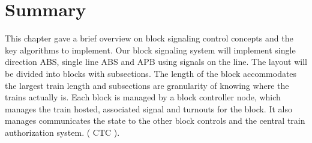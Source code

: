 \section{Summary}

This chapter gave a brief overview on block signaling control concepts and the key algorithms to implement. Our block signaling system will implement single direction ABS, single line ABS and APB using signals on the line. The layout will be divided into blocks with subsections. The length of the block accommodates the largest train length and subsections are granularity of knowing where the trains actually is. Each block is managed by a block controller node, which manages the train hosted, associated signal and turnouts for the block. It also manages communicates the state to the other block controls and the central train authorization system. ( CTC ).

